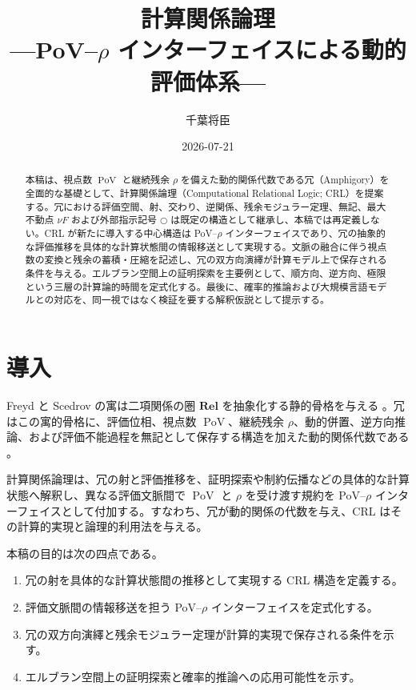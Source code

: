 \documentclass[a4paper,11pt]{ltjsarticle}
\title{計算関係論理\\
{\large ---PoV--\texorpdfstring{$\rho$}{rho} インターフェイスによる動的評価体系---}}
\author{千葉将臣}
\date{2026-07-21}
\theoremstyle{definition}
\theoremstyle{plain}
\newcommand{\PoV}{\operatorname{PoV}}
\newcommand{\dfix}{\bigcirc}
\newcommand{\Rel}{\mathbf{Rel}}
\begin{document}
\maketitle

\begin{abstract}
本稿は、視点数 $\PoV$ と継続残余 $\rho$ を備えた動的関係代数である冗（Amphigory）を全面的な基礎として、計算関係論理（Computational Relational Logic; CRL）を提案する。冗における評価空間、射、交わり、逆関係、残余モジュラー定理、無記、最大不動点 $\nu F$ および外部指示記号 $\dfix$ は既定の構造として継承し、本稿では再定義しない。CRL が新たに導入する中心構造は PoV--$\rho$ インターフェイスであり、冗の抽象的な評価推移を具体的な計算状態間の情報移送として実現する。文脈の融合に伴う視点数の変換と残余の蓄積・圧縮を記述し、冗の双方向演繹が計算モデル上で保存される条件を与える。エルブラン空間上の証明探索を主要例として、順方向、逆方向、極限という三層の計算論的時間を定式化する。最後に、確率的推論および大規模言語モデルとの対応を、同一視ではなく検証を要する解釈仮説として提示する。
\end{abstract}

\section{導入}

Freyd と Scedrov の寓は二項関係の圏 $\Rel$ を抽象化する静的骨格を与える \cite{FreydScedrov1990}。冗はこの寓的骨格に、評価位相、視点数 $\PoV$、継続残余 $\rho$、動的併置、逆方向推論、および評価不能過程を無記として保存する構造を加えた動的関係代数である \cite{ChibaAmphigory2026}。

計算関係論理は、冗の射と評価推移を、証明探索や制約伝播などの具体的な計算状態へ解釈し、異なる評価文脈間で $\PoV$ と $\rho$ を受け渡す規約を PoV--$\rho$ インターフェイスとして付加する。すなわち、冗が動的関係の代数を与え、CRL はその計算的実現と論理的利用法を与える。

本稿の目的は次の四点である。
\begin{enumerate}
 \item 冗の射を具体的な計算状態間の推移として実現する CRL 構造を定義する。
 \item 評価文脈間の情報移送を担う PoV--$\rho$ インターフェイスを定式化する。
 \item 冗の双方向演繹と残余モジュラー定理が計算的実現で保存される条件を示す。
 \item エルブラン空間上の証明探索と確率的推論への応用可能性を示す。
\end{enumerate}
\end{document}
